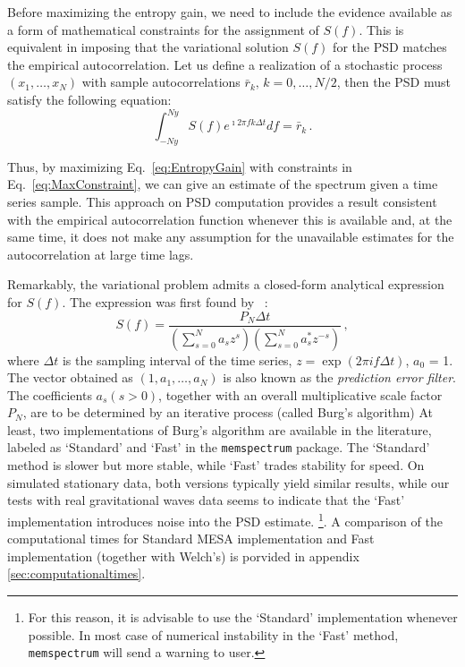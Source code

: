 \documentclass{aa}
\begin{document}
Before maximizing the entropy gain, we need to include the evidence available as a form of mathematical constraints for the assignment of $S(f)$.
This is equivalent in imposing that the variational solution $S(f)$ for the PSD matches the empirical autocorrelation.
Let us define a realization of a stochastic process $(x_1,\ldots,x_N)$ with sample autocorrelations $\bar r_k,\,k=0,\ldots, N/2$, then the PSD must satisfy the following equation:
\begin{equation}\label{eq:MaxConstraint}
\int_{-Ny}^{Ny} S(f) e^{\imath 2 \pi f k \Delta t} df = \bar r_{k}\,.
\end{equation}

Thus, by maximizing Eq.~\eqref{eq:EntropyGain} with constraints in Eq.~\eqref{eq:MaxConstraint}, we can give an estimate of the spectrum given a time series sample.
This approach on PSD computation provides a result consistent with the empirical autocorrelation function whenever this is available and, at the same time, it does not make any assumption for the unavailable estimates for the autocorrelation at large time lags.

Remarkably, the variational problem admits a closed-form analytical expression for $S(f)$.
The expression was first found by ~\citet{burg1975maximum}:
\begin{equation}\label{eq:MESApsd}
    S(f) = \frac{P_N \Delta t}{\left(\sum_{s=0}^{N} a_s z^s\right)\left(\sum_{s = 0}^N a^*_s z^{-s}\right)}\,,
\end{equation}
where $\Delta t$ is the sampling interval of the time series, $z=\exp{(2\pi i f\Delta t)}$, $a_0$ = 1.
The vector obtained as $(1, a_1, \dots, a_N)$ is also known as the \textit{prediction error filter}.
The coefficients $a_s (s > 0)$, together with an overall multiplicative scale factor $P_N$, are to be determined by an iterative process (called Burg's algorithm)
At least, two implementations of Burg's algorithm are available in the literature, labeled as `Standard' and `Fast' in the \texttt{memspectrum} package. The `Standard' method is slower but more stable, while `Fast' trades stability for speed.
On simulated stationary data, both versions typically yield similar results, while our tests with real gravitational waves data seems to indicate that the `Fast' implementation introduces noise into the PSD estimate. \footnote{For this reason, it is advisable to use the `Standard' implementation whenever possible. In most case of numerical instability in the `Fast' method, \texttt{memspectrum} will send a warning to user.}. A comparison of the computational times for Standard MESA implementation and Fast implementation (together with Welch's) is porvided in appendix \ref{sec:computationaltimes}.
\end{document}
